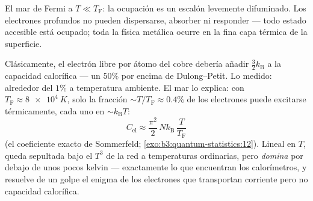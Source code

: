 \begin{omfigure}

{\small El mar de Fermi a $T \ll T_{\text{F}}$: la ocupación es un
escalón levemente difuminado. Los electrones profundos no pueden
dispersarse, absorber ni responder --- todo estado accesible está ocupado;
toda la física metálica ocurre en la fina capa térmica de la superficie.}
\end{omfigure}

\begin{example}\label{ex:b3:quantum-statistics:heat}
Clásicamente, el electrón libre por átomo del cobre debería añadir $\tfrac32
k_{\text{B}}$ a la capacidad calorífica --- un $50\%$ por encima de
Dulong--Petit. Lo medido: alrededor del $1\%$ a temperatura ambiente. El mar
lo explica: con $T_{\text{F}} \approx \qty{8e4}{K}$, solo la
fracción $\sim T/T_{\text{F}} \approx 0.4\%$ de los electrones puede
excitarse térmicamente, cada uno en $\sim k_{\text{B}}T$:
\[
C_{\text{el}} \approx \frac{\pi^2}{2}\,
Nk_{\text{B}}\,\frac{T}{T_{\text{F}}}
\]
(el coeficiente exacto de Sommerfeld;
\cref{exo:b3:quantum-statistics:12}). Lineal en $T$, queda sepultada
bajo el $T^3$ de la red a temperaturas ordinarias, pero
\emph{domina} por debajo de unos pocos kelvin --- exactamente lo que
encuentran los calorímetros, y resuelve de un golpe el enigma de los
electrones que transportan corriente pero no capacidad calorífica.
\end{example}


